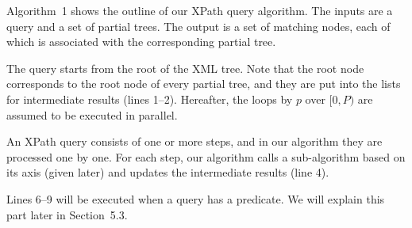 Algorithm~1 shows the outline of our XPath query algorithm.
The inputs are a query and a set of partial trees.
The output is a set of matching nodes, each of which is associated with the corresponding partial tree.

The query starts from the root of the XML tree.
Note that the root node corresponds to the root node of every partial tree,
and they are put into the lists for intermediate results (lines 1--2).
Hereafter, the loops by $p$ over $[0, P)$ are assumed to be executed in parallel.

An XPath query consists of one or more steps, and in our algorithm
they are processed one by one.  For each step, our algorithm calls
a sub-algorithm based on its axis (given later) and updates the intermediate results (line 4).

Lines 6--9 will be executed when a query has a predicate.
We will explain this part later in Section~5.3.




